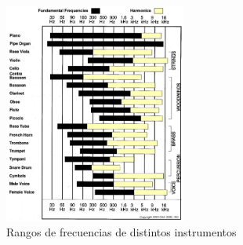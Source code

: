\begin{figure}[H]
    \centering
    \includegraphics[width=6cm]{Imagenes/Modos/RangoInstrumentos.png}
    \caption{Rangos de frecuencias de distintos instrumentos}
    \label{fig: rangos de frecuencias instrumentos}
\end{figure}


